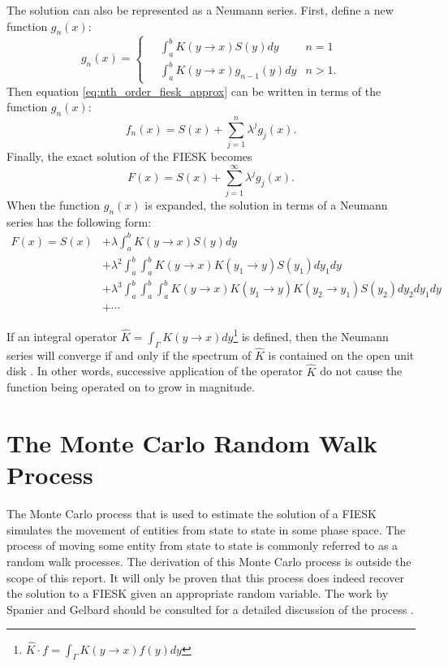 The solution can also be represented as a Neumann series. First, define a new
function $g_n(x)$:
\begin{equation}
  g_n(x) = 
  \begin{cases}
    \quad \int_a^b K(y \to x) S(y)dy & n = 1 \\
    \quad \int_a^b K(y \to x) g_{n-1}(y)dy & n > 1.
  \end{cases}
\end{equation}
Then equation \ref{eq:nth_order_fiesk_approx} can be written in terms of the 
function $g_n(x)$:
\begin{equation}
  f_n(x) = S(x) + \sum_{j=1}^n \lambda^j g_j(x).
\end{equation}
Finally, the exact solution of the FIESK becomes
\begin{equation}
  F(x) = S(x) + \sum_{j=1}^{\infty} \lambda^j g_j(x).
\end{equation}
When the function $g_n(x)$ is expanded, the solution in terms of a Neumann 
series has the following form:
\begin{equation}
  \begin{split}
    F(x) = S(x) &+ \lambda \int_a^b K(y \to x)S(y)dy \\
    & + \lambda^2 \int_a^b \int_a^b K(y \to x)K(y_1 \to y)S(y_1)dy_1dy \\
    & + \lambda^3 \int_a^b \int_a^b \int_a^b K(y \to x)K(y_1 \to y)K(y_2 \to y_1)
    S(y_2)dy_2dy_1dy \\
    & + \cdots 
  \end{split}
  \label{eq:neumann_series_soln_expansion}
\end{equation}

If an integral operator $\hat{K} = \int_{\Gamma} K(y \to x)dy$\footnote{$\hat{K} \cdot f = \int_{\Gamma} K(y \to x)f(y)dy$} 
is defined, then 
the Neumann series will converge if and only if the spectrum of $\hat{K}$ is 
contained on the open unit disk \citep{rahman_integral_2007,morse_methods_1953,spanier_monte_1969}. In other words, successive application of the operator
$\hat{K}$ do not cause the function being operated on to grow in magnitude.

\section{The Monte Carlo Random Walk Process}
\label{sec:mc_random_walk_process}
The Monte Carlo process that is used to estimate the solution of a FIESK
simulates the movement of entities from state to state in some phase space. 
The process of moving some entity from state to state is commonly referred to 
as a random walk processes. The derivation of this Monte Carlo process is 
outside the scope of this report. It will only be proven that this process does 
indeed recover the solution to a FIESK given an appropriate random variable. 
The work by Spanier and Gelbard should be consulted for a detailed discussion 
of the process \cite{spanier_monte_1969}. 

